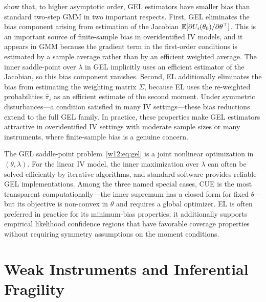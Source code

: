 \documentclass[master.tex]{subfiles}
\begin{document}
\begin{remark}
\citet{neweysmith2004} show that, to higher asymptotic order, GEL
estimators have smaller bias than standard two-step GMM in two
important respects.  First, GEL eliminates the bias component arising
from estimation of the Jacobian
$\mathbb{E}[\partial U_i(\theta_0)/\partial\theta^\top]$.  This is an
important source of finite-sample bias in overidentified IV models,
and it appears in GMM because the gradient term in the first-order
conditions is estimated by a sample average rather than by an
efficient weighted average.  The inner saddle-point over $\lambda$ in
GEL implicitly uses an efficient estimator of the Jacobian, so this
bias component vanishes.  Second, EL additionally eliminates the bias
from estimating the weighting matrix $\Sigma$, because EL uses the
re-weighted probabilities $\hat\pi_i$ as an efficient estimate of the
second moment.  Under symmetric disturbances---a condition satisfied
in many IV settings---these bias reductions extend to the full GEL
family.  In practice, these properties make GEL estimators attractive
in overidentified IV settings with moderate sample sizes or many
instruments, where finite-sample bias is a genuine concern.
\end{remark}

\begin{remark}
The GEL saddle-point problem~\eqref{w12:eq:gel} is a joint nonlinear
optimization in $(\theta, \lambda)$.  For the linear IV model, the
inner maximization over $\lambda$ can often be solved efficiently by
iterative algorithms, and standard software provides reliable GEL
implementations.  Among the three named special cases, CUE is the
most transparent computationally---the inner supremum has a closed
form for fixed $\theta$---but its objective is non-convex in $\theta$
and requires a global optimizer.  EL is often preferred in practice
for its minimum-bias properties; it additionally supports empirical
likelihood confidence regions that have favorable coverage properties
without requiring symmetry assumptions on the moment conditions.
\end{remark}


\section{Weak Instruments and Inferential Fragility}
\label{w12:sec:weak}
\end{document}
